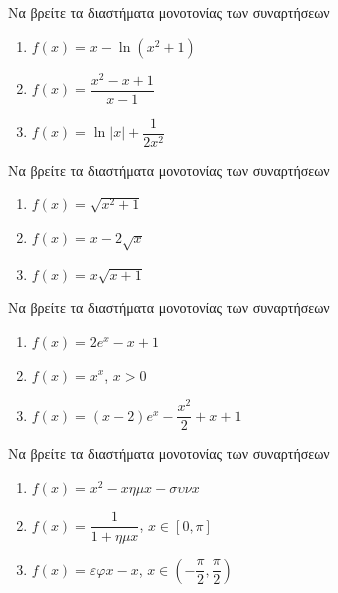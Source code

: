 \documentclass{presentation}
\begin{document}
\begin{askisi}
    Να βρείτε τα διαστήματα μονοτονίας των συναρτήσεων
    \begin{enumerate}
        \item<1-> $f(x)=x-\ln (x^2+1)$
        \item<2-> $f(x)=\dfrac{x^2-x+1}{x-1}$
        \item<3-> $f(x)=\ln |x|+\dfrac{1}{2x^2}$
    \end{enumerate}

\end{askisi}

\begin{askisi}
    Να βρείτε τα διαστήματα μονοτονίας των συναρτήσεων
    \begin{enumerate}
        \item<1-> $f(x)=\sqrt{x^2+1}$
        \item<2-> $f(x)=x-2\sqrt{x}$
        \item<3-> $f(x)=x\sqrt{x+1}$
    \end{enumerate}

\end{askisi}

\begin{askisi}
    Να βρείτε τα διαστήματα μονοτονίας των συναρτήσεων
    \begin{enumerate}
        \item<1-> $f(x)=2e^x-x+1$
        \item<2-> $f(x)=x^x$, $x>0$
        \item<3-> $f(x)=(x-2)e^x-\dfrac{x^2}{2}+x+1$
    \end{enumerate}

\end{askisi}

\begin{askisi}
    Να βρείτε τα διαστήματα μονοτονίας των συναρτήσεων
    \begin{enumerate}
        \item<1-> $f(x)=x^2-xημx-συνx$
        \item<2-> $f(x)=\dfrac{1}{1+ημx}$, $x\in [0,\pi]$
        \item<3-> $f(x)=εφx-x$, $x\in \left( -\dfrac{\pi}{2},\dfrac{\pi}{2} \right) $
    \end{enumerate}

\end{askisi}
\end{document}
